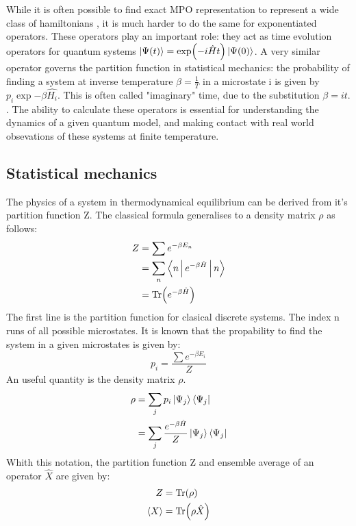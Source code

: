 
While it is often possible to find exact MPO representation to represent a wide class of hamiltonians , it is much harder to do the same for exponentiated operators. These operators play an important role: they act as time evolution operators for quantum systems $ \ket{\Psi(t)} = \exp( -i \hat{H} t ) \ket{\Psi(0)}$. A very similar operator governs the partition function in statistical mechanics: the probability of finding a system at inverse temperature $\beta = \frac{1}{T}$ in a microstate i is given by $p_i\exp{ - \beta \hat{H_i} }$. This is often called "imaginary" time, due to the substitution $\beta = i t$. . The ability to calculate these operators is essential for understanding the dynamics of a given quantum model, and making contact with real world obsevations of these systems at finite temperature.

\subsection{Statistical mechanics}

The physics of a system in thermodynamical equilibrium can be derived from it's partition function Z. The classical formula generalises to a density matrix $\rho$ as follows:
\begin{equation}
    \begin{split}
        Z &= \sum e^{ - \beta E_n} \\
        &= \sum_n \Braket{n | e^{ - \beta \hat{H} }  | n} \\
        &= \Tr( e^{ - \beta \hat{H} } )
    \end{split}
\end{equation}
The first line is the partition function for clasical discrete systems. The index n runs of all possible microstates. It is known that the propability to find the system in a given microstates is given by:
\begin{equation}
    p_i = \frac{\sum e^{ - \beta E_i}}{Z}
\end{equation}
An useful quantity is the density matrix $\rho$.
\begin{equation}
    \begin{split}
        \rho &= \sum_j p_i  \Ket{ \Psi_j} \Bra{\Psi_j}   \\
        &= \sum_j \frac{ e^{ - \beta \hat{H} } }{Z}  \Ket{ \Psi_j} \Bra{\Psi_j}
    \end{split}
\end{equation}
Whith this notation, the partition function Z and ensemble average of an operator $\hat{X}$ are given by:
\begin{equation}
    \begin{split}
        Z &= \Tr( \rho) \\
        \Braket{X} &= \Tr(\rho \hat{X})
    \end{split}
\end{equation}

